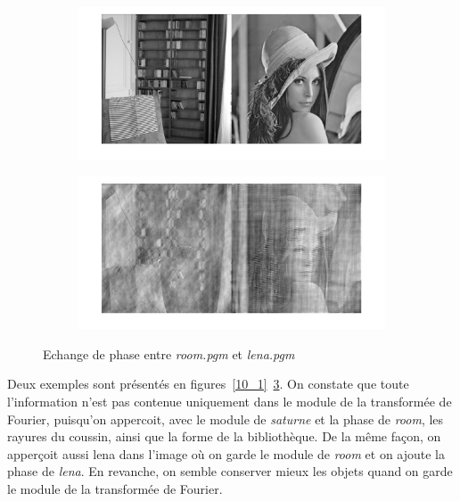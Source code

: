 \documentclass[12pt,a4paper,onecolumn]{article}
\begin{document}
\begin{figure}[H]
	\centering
	\begin{subfigure}[b]{\textwidth}
		\centering
		\includegraphics[height = 0.30\textheight]{10_1_21}
		\label{10_1_21}
	\end{subfigure}
	\vspace{2cm}
	\begin{subfigure}[b]{\textwidth}
		\centering
		\includegraphics[height = 0.30\textheight]{10_1_22}
		\label{10_1_22}
	\end{subfigure}
	\caption{Echange de phase entre \textit{room.pgm} et \textit{lena.pgm}}
	\label{10_2}
\end{figure}

Deux exemples sont présentés en figures~\ref{10_1}~\ref{10_2}. On constate que toute l'information n'est pas contenue uniquement dans le module de la transformée de Fourier, puisqu'on appercoit, avec le module de \textit{saturne} et la phase de \textit{room}, les rayures du coussin, ainsi que la forme de la bibliothèque. De la même façon, on apperçoit aussi lena dans l'image où on garde le module de \textit{room} et on ajoute la phase de \textit{lena}. En revanche, on semble conserver mieux les objets quand on garde le module de la transformée de Fourier.
\end{document}

